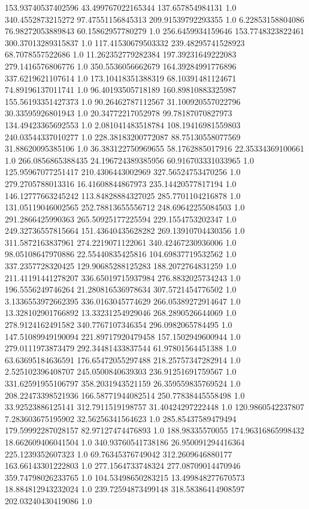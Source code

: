 153.93740537402596	43.499767022165344	137.657854984131	1.0
340.4552873215272	97.47551156845313	209.91539792293355	1.0
6.22853158804086	76.98272053889843	60.15862957780279	1.0
256.6459934159646	153.7748323822461	300.37013289315837	1.0
117.41530679503332	239.48295741528923	68.7078557522686	1.0
11.262352779282384	197.39231649222083	279.1416576806776	1.0
350.5536056662679	164.39284991776896	337.6219621107614	1.0
173.10418351388319	68.10391481124671	74.89196137011741	1.0
96.40193505718189	160.89810883325987	155.56193351427373	1.0
90.26462787112567	31.100920557022796	30.33595926801943	1.0
20.34772217052978	99.78187070827973	134.49423365692553	1.0
2.081041483518784	108.19416981559803	240.03544337010277	1.0
228.38183200772087	88.75130558077569	31.88620095385106	1.0
36.383122750969655	58.1762885017916	22.35334369100661	1.0
266.0856865388435	24.196724389385956	60.916703331033965	1.0
125.95967077251417	210.4306443002969	327.56524753470256	1.0
279.2705788013316	16.41608844867973	235.14420577817194	1.0
146.12777663245242	113.84828884327025	285.7701104216878	1.0
131.05119046002565	252.78813655556712	248.69642255084503	1.0
291.2866425990363	265.50925177225594	229.1554753202347	1.0
249.32736557815664	151.43640435628282	269.13910704430356	1.0
311.5872163837961	274.2219071122061	340.42467230936006	1.0
98.05108647970886	22.55440835425816	104.69837719532562	1.0
337.2357728320425	129.90685288125283	188.2072764831259	1.0
211.41191441278207	336.65019715937984	276.8832025734243	1.0
196.5556249746264	21.280816536978634	307.5721454776502	1.0
3.1336553972662395	336.0163045774629	266.05389272914647	1.0
13.328102901766892	13.33231254929046	268.2890526644069	1.0
278.9124162491582	340.7767107346354	296.0982065784495	1.0
147.51089949190094	221.89717920479458	157.1502949600944	1.0
279.0111973873479	292.34481433837544	61.97801564451388	1.0
63.63695184636591	176.65472055297488	218.25757347282914	1.0
2.525102396408707	245.0500840639303	236.91251691759567	1.0
331.62591955106797	358.2031943521159	26.359559835769524	1.0
208.22473398521936	166.58771944082514	250.77838445558498	1.0
33.92523886125141	312.7911519198757	31.40424297222448	1.0
120.9860542237807	7.283603675195902	32.56256341564623	1.0
285.85437589479494	179.59992287028157	82.97127474476893	1.0
188.98335570055	174.96316865998432	18.662609406041504	1.0
340.93760541738186	26.950091294416364	225.1239352607323	1.0
69.76345376749042	312.2609646880177	163.66143301222803	1.0
277.1564733748324	277.08709014470946	359.74798026233765	1.0
104.53498650283215	13.499848277670573	18.884812943232024	1.0
239.72594873499148	318.58386414908597	202.03240430419086	1.0
